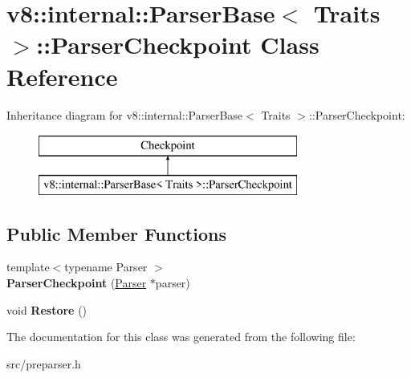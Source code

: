\hypertarget{classv8_1_1internal_1_1_parser_base_1_1_parser_checkpoint}{}\section{v8\+:\+:internal\+:\+:Parser\+Base$<$ Traits $>$\+:\+:Parser\+Checkpoint Class Reference}
\label{classv8_1_1internal_1_1_parser_base_1_1_parser_checkpoint}
Inheritance diagram for v8\+:\+:internal\+:\+:Parser\+Base$<$ Traits $>$\+:\+:Parser\+Checkpoint\+:\begin{figure}[H]
\begin{center}
\leavevmode
\includegraphics[height=2.000000cm]{classv8_1_1internal_1_1_parser_base_1_1_parser_checkpoint}
\end{center}
\end{figure}
\subsection*{Public Member Functions}
\begin{DoxyCompactItemize}
\item 
\hypertarget{classv8_1_1internal_1_1_parser_base_1_1_parser_checkpoint_a275b482a8b7c115a53569c6359b91912}{}{\footnotesize template$<$typename Parser $>$ }\\{\bfseries Parser\+Checkpoint} (\hyperlink{classv8_1_1internal_1_1_parser}{Parser} $\ast$parser)\label{classv8_1_1internal_1_1_parser_base_1_1_parser_checkpoint_a275b482a8b7c115a53569c6359b91912}

\item 
\hypertarget{classv8_1_1internal_1_1_parser_base_1_1_parser_checkpoint_ac497fb76a56ed92588ecf17d3b868304}{}void {\bfseries Restore} ()\label{classv8_1_1internal_1_1_parser_base_1_1_parser_checkpoint_ac497fb76a56ed92588ecf17d3b868304}

\end{DoxyCompactItemize}


The documentation for this class was generated from the following file\+:\begin{DoxyCompactItemize}
\item 
src/preparser.\+h\end{DoxyCompactItemize}
